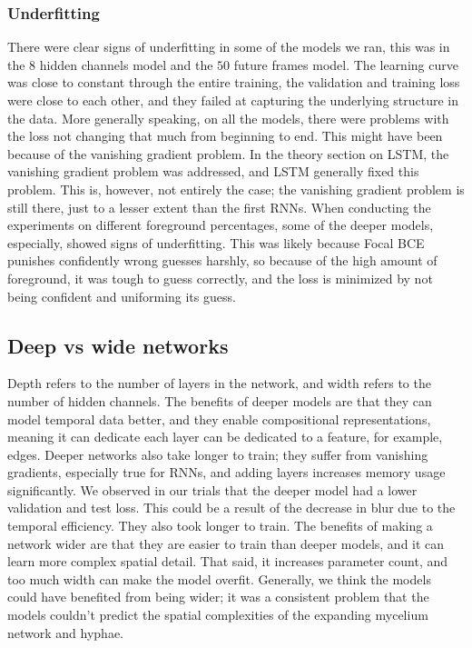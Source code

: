 \documentclass[a4paper,12pt]{article}
\begin{document}
\subsubsection{Underfitting}
There were clear signs of underfitting in some of the models we ran, this was in the $8$ hidden channels model and the $50$ future frames model. The learning curve was close to constant through the entire training, the validation and training loss were close to each other, and they failed at capturing the underlying structure in the data.
More generally speaking, on all the models, there were problems with the loss not changing that much from beginning to end. This might have been because of the vanishing gradient problem. In the theory section on LSTM, the vanishing gradient problem was addressed, and LSTM generally fixed this problem. This is, however, not entirely the case; the vanishing gradient problem is still there, just to a lesser extent than the first RNNs.
When conducting the experiments on different foreground percentages, some of the deeper models, especially, showed signs of underfitting. This was likely because Focal BCE punishes confidently wrong guesses harshly, so because of the high amount of foreground, it was tough to guess correctly, and the loss is minimized by not being confident and uniforming its guess.
\subsection{Deep vs wide networks}
Depth refers to the number of layers in the network, and width refers to the number of hidden channels. The benefits of deeper models are that they can model temporal data better, and they enable compositional representations, meaning it can dedicate each layer can be dedicated to a feature, for example, edges.
Deeper networks also take longer to train; they suffer from vanishing gradients, especially true for RNNs, and adding layers increases memory usage significantly. We observed in our trials that the deeper model had a lower validation and test loss. This could be a result of the decrease in blur due to the temporal efficiency. They also took longer to train.
The benefits of making a network wider are that they are easier to train than deeper models, and it can learn more complex spatial detail. That said, it increases parameter count, and too much width can make the model overfit.
Generally, we think the models could have benefited from being wider; it was a consistent problem that the models couldn't predict the spatial complexities of the expanding mycelium network and hyphae.
\end{document}
